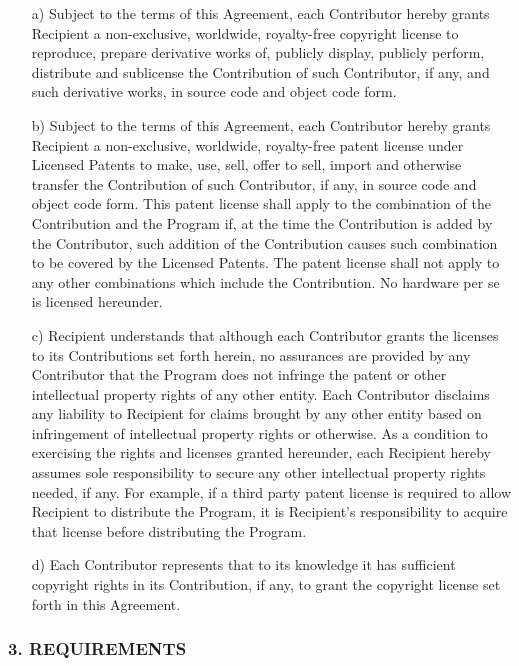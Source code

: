 \begin{itemize}
\item[a)]	Subject to the terms of this Agreement, each Contributor hereby grants Recipient a non-exclusive, worldwide, royalty-free copyright license to reproduce,
prepare derivative works of, publicly display, publicly perform,
distribute and sublicense the Contribution of such Contributor, if any,
and such derivative works, in source code and object code form.


\item[b)] 	Subject to the terms of this Agreement, each Contributor hereby grants Recipient a non-exclusive, worldwide, royalty-free
patent license under Licensed Patents to make, use, sell, offer to
sell, import and otherwise transfer the Contribution of such
Contributor, if any, in source code and object code form. This patent
license shall apply to the combination of the Contribution and the
Program if, at the time the Contribution is added by the Contributor,
such addition of the Contribution causes such combination to be covered
by the Licensed Patents. The patent license shall not apply to any
other combinations which include the Contribution. No hardware per se
is licensed hereunder. 


\item[c)] Recipient understands that although each
Contributor grants the licenses to its Contributions set forth herein,
no assurances are provided by any Contributor that the Program does not
infringe the patent or other intellectual property rights of any other
entity. Each Contributor disclaims any liability to Recipient for
claims brought by any other entity based on infringement of
intellectual property rights or otherwise. As a condition to exercising
the rights and licenses granted hereunder, each Recipient hereby
assumes sole responsibility to secure any other intellectual property
rights needed, if any. For example, if a third party patent license is
required to allow Recipient to distribute the Program, it is
Recipient's responsibility to acquire that license before distributing
the Program.


\item[d)] Each Contributor represents that to its knowledge
it has sufficient copyright rights in its Contribution, if any, to
grant the copyright license set forth in this Agreement. 

\end{itemize}


\subsubsection*{3.  REQUIREMENTS}


